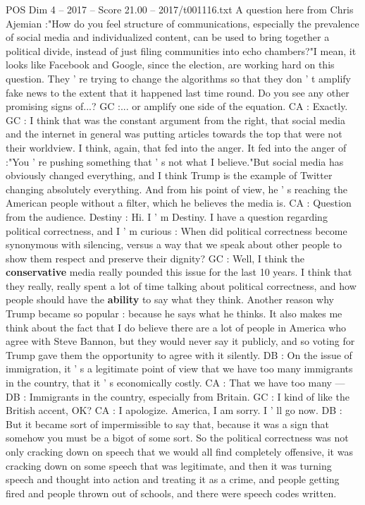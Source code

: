 \begin{textsample}{POS Dim 4 – 2017 – Score 21.00 – 2017/t001116.txt}
A question here from Chris Ajemian :"How do you feel structure of communications, especially the prevalence of social media and individualized content, can be used to bring together a political divide, instead of just filing communities into echo chambers?"I mean, it looks like Facebook and Google, since the election, are working hard on this question.
They ' re trying to change the algorithms so that they don ' t amplify fake news to the extent that it happened last time round.
Do you see any other promising signs of...?
GC :... or amplify one side of the equation.
CA : Exactly.
GC : I think that was the constant argument from the right, that social media and the internet in general was putting articles towards the top that were not their worldview.
I think, again, that fed into the anger.
It fed into the anger of :"You ' re pushing something that ' s not what I believe."But social media has obviously changed everything, and I think Trump is the example of Twitter changing absolutely everything.
And from his point of view, he ' s reaching the American people without a filter, which he believes the media is.
CA : Question from the audience.
Destiny : Hi.
I ' m Destiny.
I have a question regarding political correctness, and I ' m curious : When did political correctness become synonymous with silencing, versus a way that we speak about other people to show them respect and preserve their dignity?
GC : Well, I think the \textbf{conservative} media really pounded this issue for the last 10 years.
I think that they really, really spent a lot of time talking about political correctness, and how people should have the \textbf{ability} to say what they think.
Another reason why Trump became so popular : because he says what he thinks.
It also makes me think about the fact that I do believe there are a lot of people in America who agree with Steve Bannon, but they would never say it publicly, and so voting for Trump gave them the opportunity to agree with it silently.
DB : On the issue of immigration, it ' s a legitimate point of view that we have too many immigrants in the country, that it ' s economically costly.
CA : That we have too many — DB : Immigrants in the country, especially from Britain.
GC : I kind of like the British accent, OK?
CA : I apologize.
America, I am sorry.
I ' ll go now.
DB : But it became sort of impermissible to say that, because it was a sign that somehow you must be a bigot of some sort.
So the political correctness was not only cracking down on speech that we would all find completely offensive, it was cracking down on some speech that was legitimate, and then it was turning speech and thought into action and treating it as a crime, and people getting fired and people thrown out of schools, and there were speech codes written.

\end{textsample}
